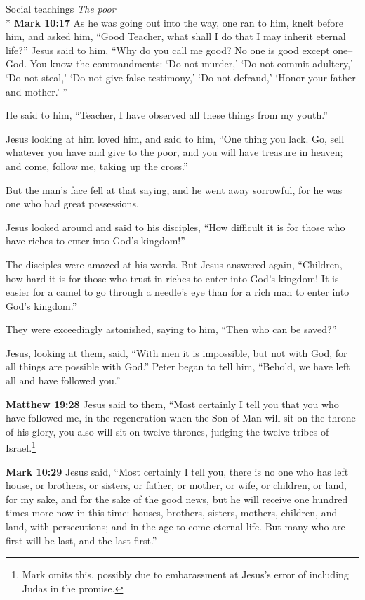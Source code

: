 \documentclass[10pt,twoside]{article} %
\newcommand{\quotesize}{\normalsize{}}
\newenvironment{quotetext}{\begingroup\quotesize}{\endgroup}
\newcommand{\intex}[1]{\index[texts]{#1}}
\newcommand{\bible}[2]{\begin{quotetext}\textbf{#1}\intex{#1} #2\end{quotetext}}
\newcommand{\matthew}[2]{\bible{Matthew #1}{#2}}
\newcommand{\gospelmark}[2]{\bible{Mark #1}{#2}}
\newcommand{\subhead}[1]{\emph{#1}\\*}
\begin{document}
\begin{section}{Social teachings}
\subhead{The poor}
\gospelmark{10:17}{
As he was going out into the way, one ran to him, knelt before him, and asked him, ``Good Teacher, what shall I do that I may inherit eternal life?''
  Jesus said to him, ``Why do you call me good? No one is good except one--God.    You know the commandments: `Do not murder,' `Do not commit adultery,' `Do not steal,' `Do not give false testimony,' `Do not defraud,' `Honor your father and mother.' ''

  He said to him, ``Teacher, I have observed all these things from my youth.''

  Jesus looking at him loved him, and said to him, ``One thing you lack. Go, sell whatever you have and give to the poor, and you will have treasure in heaven; and come, follow me, taking up the cross.''

  But the man's face fell at that saying, and he went away sorrowful, for he was one who had great possessions.

  Jesus looked around and said to his disciples, ``How difficult it is for those who have riches to enter into God's kingdom!''

  The disciples were amazed at his words. But Jesus answered again, ``Children, how hard it is for those who trust in riches to enter into God's kingdom!    It is easier for a camel to go through a needle's eye than for a rich man to enter into God's kingdom.''

  They were exceedingly astonished, saying to him, ``Then who can be saved?''

  Jesus, looking at them, said, ``With men it is impossible, but not with God, for all things are possible with God.'' 
 Peter began to tell him, ``Behold, we have left all and have followed you.''
}

\matthew{19:28}{
Jesus said to them, ``Most certainly I tell you that you who have followed me, in the regeneration when the Son of Man will sit on the throne of his glory, you also will sit on twelve thrones, judging the twelve tribes of Israel.\footnote{Mark omits this, possibly due to  embarassment
at Jesus's error of including Judas in the promise.}
}

\gospelmark{10:29}{
  Jesus said, ``Most certainly I tell you, there is no one who has left house, or brothers, or sisters, or father, or mother, or wife, or children, or land, for my sake, and for the sake of the good news,    but he will receive one hundred times more now in this time: houses, brothers, sisters, mothers, children, and land, with persecutions; and in the age to come eternal life.    But many who are first will be last, and the last first.'' }

\end{section}
\end{document}
